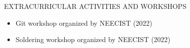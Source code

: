 \documentclass[14pt]{resume} %
\begin{document}




\begin{rSection}{EXTRACURRICULAR ACTIVITIES AND WORKSHOPS} 
\begin{itemize}
    \vspace{1ex}
    \item 	Git workshop organized by NEECIST (2022)
    \vspace{2ex}
    \item	Soldering workshop organized by NEECIST (2022)
\end{itemize}


\end{rSection}
\end{document}
